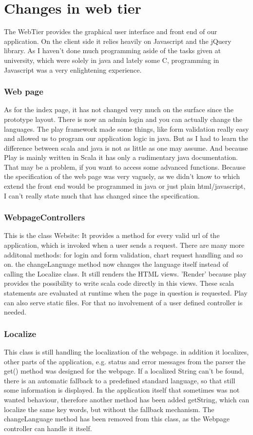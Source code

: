 \section{Changes in web tier}

The WebTier provides the graphical user interface and front end of our application.
On the client side it relies heavily on Javascript and the jQuery library.
As I haven't done much programming aside of the tasks given at university, which were solely in java and lately some C,
programming in Javascript was a very enlightening experience.

\subsubsection{Web page}
As for the index page, it has not changed very much on the surface since the prototype layout.
There is now an admin login and you can actually change the languages.
The play framework made some things, like form validation really easy and allowed us to program our application logic in java.
But as I had to learn the difference between scala and java is not as little as one may assume.
And because Play is mainly written in Scala it has only a rudimentary java documentation. That may be a problem, if you want
to access some advanced functions.
Because the specification of the web page was very vaguely, as we didn't know to which extend the front end would be
programmed in java or just plain html/javascript, I can't really state much that has changed since the specification.

\subsubsection{WebpageControllers}
This is the class Website: It provides a method for every valid url of the application, which is invoked when a user sends
a request.
There are many more additonal methods:
for login and form validation, chart request handling and so on.
the changeLanguage method now changes the language itself instead of calling the Localize class.
It still renders the HTML views. 'Render' because play provides the possibility to write scala code directly in this views.
These scala statements are evaluated at runtime when the page in question is requested.
Play can also serve static files. For that no involvement of a user defined controller is needed.

\subsubsection{Localize}
This class is still handling the localization of the webpage. in addition it localizes, other parts of the application,
e.g. status and error messages from the parser
the get() method was designed for the webpage. If a localized String can't be found, there is an automatic fallback to a
predefined standard language, so that still some information is displayed.
In the application itself that sometimes was not wanted behaviour, therefore another method has been added
getString, which can localize the same key words, but without the fallback mechanism.
The changeLanguage method has been removed from this class, as the Webpage controller can handle it itself.

